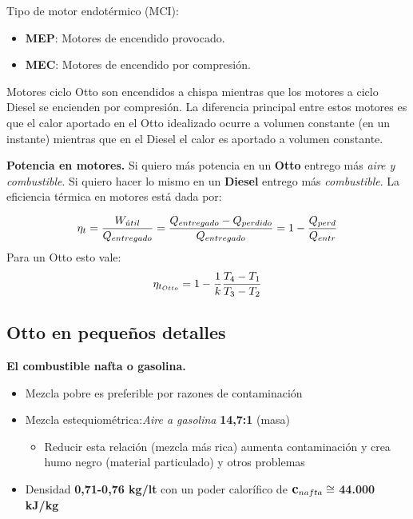 Tipo de motor endotérmico (MCI):
\begin{itemize}
    \item \textbf{MEP}: Motores de encendido provocado.
    \item \textbf{MEC}: Motores de encendido por compresión.
\end{itemize}

Motores ciclo Otto son encendidos a chispa mientras que los motores a ciclo Diesel se encienden por compresión. La diferencia principal entre estos motores es que el calor aportado en el Otto idealizado ocurre a volumen constante (en un instante) mientras que en el Diesel el calor es aportado a volumen constante.

    
{\bf Potencia en motores.} Si quiero más potencia en un \textbf{Otto} entrego más \textit{aire y combustible}. Si quiero hacer lo mismo en un \textbf{Diesel} entrego más \textit{combustible}. La eficiencia térmica en motores está dada por:

\[
\eta_t=\frac{W_{\acute{u}til}}{Q_{entregado}}=\frac{Q_{entregado}-Q_{perdido}}{Q_{entregado}}=1-\frac{Q_{perd}}{Q_{entr}}
\]
Para un Otto esto vale:
\[
\eta_{t_{Otto}}=1-\frac{1}{k}\frac{T_4-T_1}{T_3-T_2}
\]
\subsection{Otto en pequeños detalles}

\textbf{El combustible nafta o gasolina.} 
\begin{itemize}
    \item Mezcla pobre es preferible por razones de contaminación 
    \item Mezcla estequiométrica:\textit{Aire a gasolina} \textbf{14,7:1} (masa) 
    \begin{itemize}
        \item Reducir esta relación (mezcla más rica) aumenta contaminación y crea humo negro (material particulado) y otros problemas
    \end{itemize}
    \item Densidad \textbf{0,71-0,76 kg/lt} con un poder calorífico de $\mbox{\large$\mathbf{c}$}_{nafta}\cong$ \textbf{44.000 kJ/kg}
\end{itemize}

